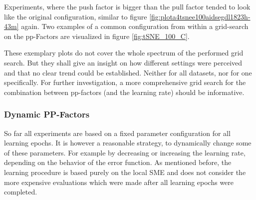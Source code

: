 		Experiments, where the push factor is bigger than the pull factor tended to look like the original configuration, similar to figure \ref{fig:plota4tsnee100aidsegdl1823h-43m}
		again.
		Two examples of a common configuration from within a grid-search on the pp-Factors are visualized in figure \ref{fig:tSNE_100_C}.
		
		These exemplary plots do not cover the whole spectrum of the performed grid search. 
		But they shall give an insight on how different settings were perceived and that no clear trend could be established.
		Neither for all datasets, nor for one specifically.
		For further investigation, a more comprehensive grid search for the combination between pp-factors (and the learning rate) should be informative.	
	
	
%		
%		
		
		
	\subsubsection{Dynamic PP-Factors} \label{subsubsec:exp_dynamic_pp} %
		So far all experiments are based on a fixed parameter configuration for all learning epochs.
		It is however a reasonable strategy, to dynamically change some of these parameters.
		For example by decreasing or increasing the learning rate, depending on the behavior of the error function.
		As mentioned before, the learning procedure is based purely on the local SME and does not consider the more expensive evaluations which were made after all learning epochs were completed.
		
